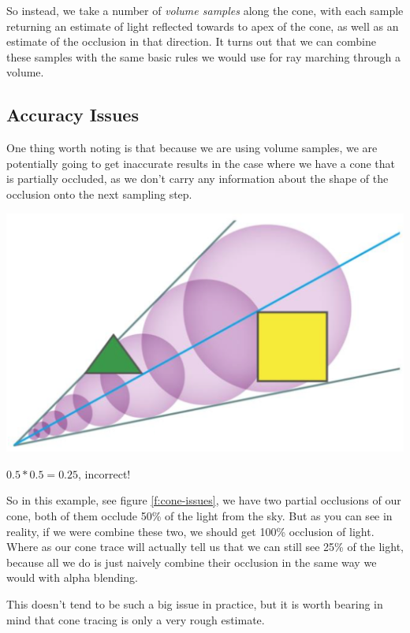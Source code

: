 So instead, we take a number of \textit{volume samples} along the cone, with each sample returning an estimate of light reflected towards to apex of the cone, as well as an estimate of the occlusion in that direction. It turns out that we can combine these samples with the same basic rules we would use for ray marching through a volume.




\subsection{Accuracy Issues}
One thing worth noting is that because we are using volume samples, we are potentially going to get inaccurate results in the case where we have a cone that is partially occluded, as we don't carry any information about the shape of the occlusion onto the next sampling step.

\begin{marginfigure}
	\begin{center}
		\includegraphics[width=1.0\textwidth]{graphics/vct/vct-2-3}
	\end{center}
	\caption{$0.5*0.5=0.25$, incorrect!}
	\label{f:cone-issues}
\end{marginfigure}

So in this example, see figure \ref{f:cone-issues}, we have two partial occlusions of our cone, both of them occlude 50\% of the light from the sky. But as you can see in reality, if we were combine these two, we should get 100\% occlusion of light. Where as our cone trace will actually tell us that we can still see 25\% of the light, because all we do is just naively combine their occlusion in the same way we would with alpha blending.

This doesn't tend to be such a big issue in practice, but it is worth bearing in mind that cone tracing is only a very rough estimate. 






